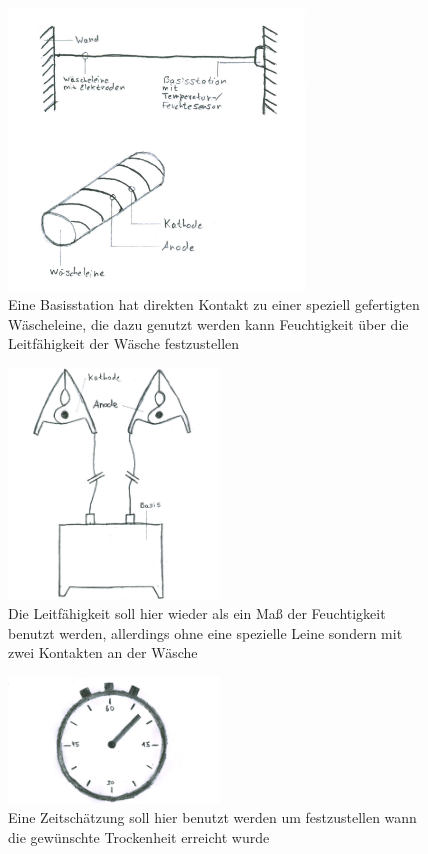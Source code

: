\begin{figure}[htb] 
	\centerline{\includegraphics*[width=0.7\textwidth]{./10+10/Concept/03-leine}}
	\caption{Eine Basisstation hat direkten Kontakt zu einer speziell gefertigten Wäscheleine, die dazu genutzt werden kann Feuchtigkeit über die Leitfähigkeit der Wäsche festzustellen}
	\label{10+10_leine}
\end{figure}
\begin{figure}[htb] 
	\centerline{\includegraphics*[width=0.5\textwidth]{./10+10/Concept/05-getrennt}}
	\caption{Die Leitfähigkeit soll hier wieder als ein Maß der Feuchtigkeit benutzt werden, allerdings ohne eine spezielle Leine sondern mit zwei Kontakten an der Wäsche}
	\label{10+10_getrennt}
\end{figure}
\begin{figure}[htb] 
	\centerline{\includegraphics*[width=0.5\textwidth]{./10+10/Concept/06-zeit}}
	\caption{Eine Zeitschätzung soll hier benutzt werden um festzustellen wann die gewünschte Trockenheit erreicht wurde}
	\label{10+10_zeit}
\end{figure}
